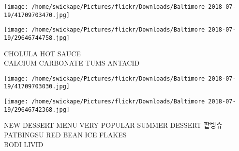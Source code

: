 \documentclass[10pt,letterpaper]{article}
\begin{document}
\texttt{[image: /home/swickape/Pictures/flickr/Downloads/Baltimore 2018-07-19/41709703470.jpg]}

\vspace{0.25in}
\texttt{[image: /home/swickape/Pictures/flickr/Downloads/Baltimore 2018-07-19/29646744758.jpg]}

CHOLULA HOT SAUCE\\
CALCIUM CARBONATE TUMS ANTACID\\
\pagebreak

\texttt{[image: /home/swickape/Pictures/flickr/Downloads/Baltimore 2018-07-19/41709703030.jpg]}

\vspace{0.25in}
\texttt{[image: /home/swickape/Pictures/flickr/Downloads/Baltimore 2018-07-19/29646742368.jpg]}

NEW DESSERT MENU VERY POPULAR SUMMER DESSERT 팥빙슈 PATBINGSU RED BEAN ICE FLAKES\\
BODI LIVID\\
\pagebreak
\end{document}
